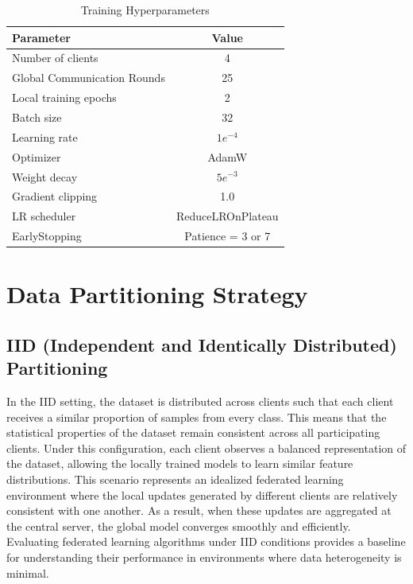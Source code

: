 \documentclass[12pt]{book}
\begin{document}
\begin{table}[h]
\centering
\caption{Training Hyperparameters}
\begin{tabular}{|l|c|}
\hline
\textbf{Parameter} & \textbf{Value} \\ \hline
Number of clients & 4 \\ \hline
Global Communication Rounds & 25 \\ \hline
Local training epochs & 2 \\ \hline
Batch size & 32 \\ \hline
Learning rate & $1e^{-4}$ \\ \hline
Optimizer & AdamW \\ \hline
Weight decay & $5e^{-3}$ \\ \hline
Gradient clipping & 1.0 \\ \hline
LR scheduler & ReduceLROnPlateau \\ \hline
EarlyStopping & Patience = 3 or 7 \\ \hline
\end{tabular}
\label{tab:training_params}
\end{table}

\vspace{2.5cm}

\section{Data Partitioning Strategy}


\subsection{IID (Independent and Identically Distributed) Partitioning}

In the IID setting, the dataset is distributed across clients such that each client receives a similar proportion of samples from every class. This means that the statistical properties of the dataset remain consistent across all participating clients. Under this configuration, each client observes a balanced representation of the dataset, allowing the locally trained models to learn similar feature distributions.
This scenario represents an idealized federated learning environment where the local updates generated by different clients are relatively consistent with one another. As a result, when these updates are aggregated at the central server, the global model converges smoothly and efficiently. Evaluating federated learning algorithms under IID conditions provides a baseline for understanding their performance in environments where data heterogeneity is minimal.
\end{document}
